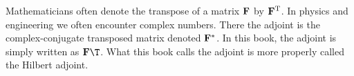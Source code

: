 \par
Mathematicians often denote the transpose of a matrix
$\bold F$ by $\bold F^{\rm T}$.
In physics and engineering we often encounter complex numbers.
There the adjoint is the complex-conjugate transposed matrix
denoted $\bold F^\ast$.
In this book, the adjoint is simply written as $\bold F\T$.
What this book calls the adjoint is more properly called the Hilbert adjoint.

%


